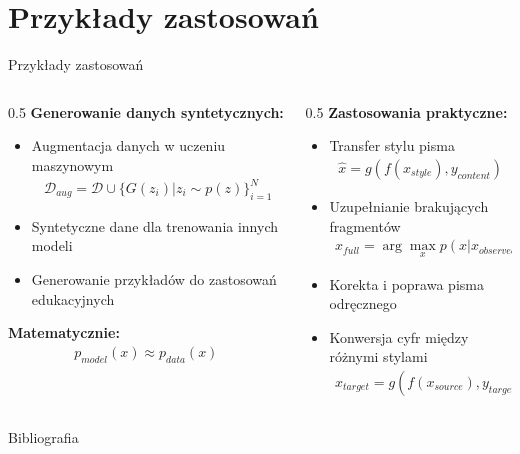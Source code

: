 \documentclass{beamer}
\begin{document}
\section{Przykłady zastosowań}

\begin{frame}{Przykłady zastosowań}
    \begin{columns}
        \begin{column}{0.5\textwidth}
            \textbf{Generowanie danych syntetycznych:}
            \begin{itemize}
                \item Augmentacja danych w uczeniu maszynowym
                      \begin{align*}
                          \mathcal{D}_{aug} = \mathcal{D} \cup \{G(z_i) | z_i \sim p(z)\}_{i=1}^N
                      \end{align*}
                \item Syntetyczne dane dla trenowania innych modeli
                \item Generowanie przykładów do zastosowań edukacyjnych
            \end{itemize}

            \textbf{Matematycznie:}
            \begin{align*}
                p_{model}(x) \approx p_{data}(x)
            \end{align*}
        \end{column}
        \begin{column}{0.5\textwidth}
            \textbf{Zastosowania praktyczne:}
            \begin{itemize}
                \item Transfer stylu pisma
                      \begin{align*}
                          \hat{x} = g(f(x_{style}), y_{content})
                      \end{align*}
                \item Uzupełnianie brakujących fragmentów
                      \begin{align*}
                          \hat{x}_{full} = \arg\max_x p(x | x_{observed})
                      \end{align*}
                \item Korekta i poprawa pisma odręcznego
                \item Konwersja cyfr między różnymi stylami
                      \begin{align*}
                          x_{target} = g(f(x_{source}), y_{target})
                      \end{align*}
            \end{itemize}
        \end{column}
    \end{columns}
\end{frame}


\begin{frame}[allowframebreaks]{Bibliografia}
    \printbibliography
\end{frame}
\end{document}
